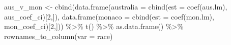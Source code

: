 \documentclass[
]{book}
\newenvironment{Shaded}{\begin{snugshade}}{\end{snugshade}}
\newcommand{\AttributeTok}[1]{\textcolor[rgb]{0.77,0.63,0.00}{#1}}
\newcommand{\DecValTok}[1]{\textcolor[rgb]{0.00,0.00,0.81}{#1}}
\newcommand{\FunctionTok}[1]{\textcolor[rgb]{0.00,0.00,0.00}{#1}}
\newcommand{\NormalTok}[1]{#1}
\newcommand{\OtherTok}[1]{\textcolor[rgb]{0.56,0.35,0.01}{#1}}
\newcommand{\SpecialCharTok}[1]{\textcolor[rgb]{0.00,0.00,0.00}{#1}}
\newcommand{\StringTok}[1]{\textcolor[rgb]{0.31,0.60,0.02}{#1}}
\begin{document}
\begin{Shaded}
\begin{Highlighting}[]
\NormalTok{aus\_v\_mon }\OtherTok{\textless{}{-}} \FunctionTok{cbind}\NormalTok{(}\FunctionTok{data.frame}\NormalTok{(}\AttributeTok{australia =} \FunctionTok{cbind}\NormalTok{(}\AttributeTok{est =} \FunctionTok{coef}\NormalTok{(aus.lm), aus\_coef\_ci)[}\DecValTok{2}\NormalTok{,]), }
\FunctionTok{data.frame}\NormalTok{(}\AttributeTok{monaco =} \FunctionTok{cbind}\NormalTok{(}\AttributeTok{est =} \FunctionTok{coef}\NormalTok{(mon.lm), mon\_coef\_ci)[}\DecValTok{2}\NormalTok{,])) }\SpecialCharTok{\%\textgreater{}\%} \FunctionTok{t}\NormalTok{() }\SpecialCharTok{\%\textgreater{}\%}
  \FunctionTok{as.data.frame}\NormalTok{() }\SpecialCharTok{\%\textgreater{}\%}
  \FunctionTok{rownames\_to\_column}\NormalTok{(}\AttributeTok{var =} \StringTok{\textquotesingle{}race\textquotesingle{}}\NormalTok{)}



\end{Highlighting}
\end{Shaded}
\end{document}

